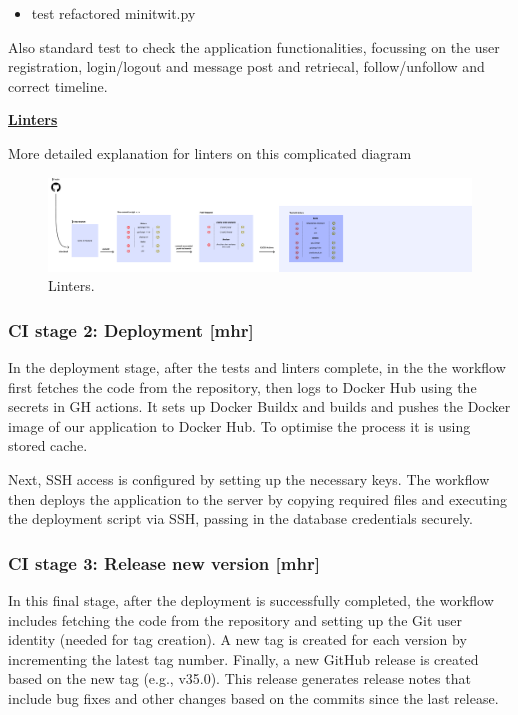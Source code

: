 \documentclass{article}
\begin{document}
\begin{itemize}
    \item test refactored minitwit.py
\end{itemize}
Also standard test to check the application functionalities, focussing on the user registration, login/logout and message post and retriecal, follow/unfollow and correct timeline.

\noindent \textbf{\underline{Linters}} 

More detailed explanation for linters on this complicated diagram

\begin{figure}[ht]
    \centering
    \includegraphics[width=1.0\textwidth]{./pdfs/linter.pdf} 
    \caption{Linters.}
    \label{fig:Linter}
\end{figure}


\subsubsection{CI stage 2: Deployment [mhr]}
In the deployment stage, after the tests and linters complete, in the the workflow first fetches the code from the repository, then logs to Docker Hub using the secrets in GH actions. It sets up Docker Buildx and builds and pushes the Docker image of our application to Docker Hub. To optimise the process it is using stored cache.

Next, SSH access is configured by setting up the necessary keys. The workflow then deploys the application to the server by copying required files and executing the deployment script via SSH, passing in the database credentials securely.

\subsubsection{CI stage 3: Release new version [mhr]}
In this final stage, after the deployment is successfully completed, the workflow includes fetching the code from the repository and setting up the Git user identity (needed for tag creation). A new tag is created for each version by incrementing the latest tag number. Finally, a new GitHub release is created based on the new tag (e.g., v35.0). This release generates release notes that include bug fixes and other changes based on the commits since the last release.
\end{document}
